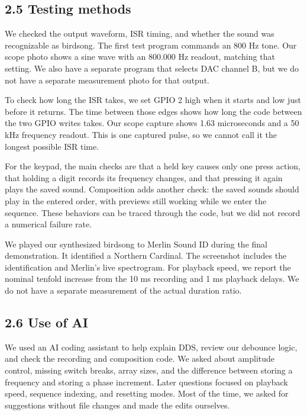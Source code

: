 \documentclass[11pt,letterpaper]{article}
\begin{document}
\subsection*{2.5 Testing methods}

We checked the output waveform, ISR timing, and whether the sound was recognizable as birdsong. The first test program commands an 800 Hz tone. Our scope photo shows a sine wave with an 800.000 Hz readout, matching that setting. We also have a separate program that selects DAC channel B, but we do not have a separate measurement photo for that output.

To check how long the ISR takes, we set GPIO 2 high when it starts and low just before it returns. The time between those edges shows how long the code between the two GPIO writes takes. Our scope capture shows 1.63 microseconds and a 50 kHz frequency readout. This is one captured pulse, so we cannot call it the longest possible ISR time.

For the keypad, the main checks are that a held key causes only one press action, that holding a digit records its frequency changes, and that pressing it again plays the saved sound. Composition adds another check: the saved sounds should play in the entered order, with previews still working while we enter the sequence. These behaviors can be traced through the code, but we did not record a numerical failure rate.

We played our synthesized birdsong to Merlin Sound ID during the final demonstration. It identified a Northern Cardinal. The screenshot includes the identification and Merlin's live spectrogram. For playback speed, we report the nominal tenfold increase from the 10 ms recording and 1 ms playback delays. We do not have a separate measurement of the actual duration ratio.

\subsection*{2.6 Use of AI}

We used an AI coding assistant to help explain DDS, review our debounce logic, and check the recording and composition code. We asked about amplitude control, missing switch breaks, array sizes, and the difference between storing a frequency and storing a phase increment. Later questions focused on playback speed, sequence indexing, and resetting modes. Most of the time, we asked for suggestions without file changes and made the edits ourselves.
\end{document}
